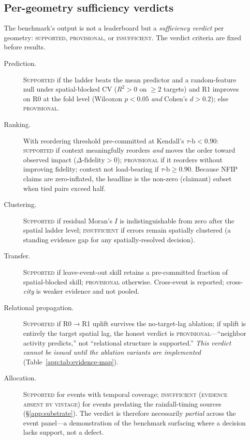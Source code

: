 \subsection{Per-geometry sufficiency verdicts}
\label{app:verdicts}
The benchmark's output is not a leaderboard but a \emph{sufficiency
verdict} per geometry: \textsc{supported}, \textsc{provisional}, or
\textsc{insufficient}. The verdict criteria are fixed before results.

\begin{description}
\item[Prediction.] \textsc{Supported} if the ladder beats the mean
  predictor and a random-feature null under spatial-blocked CV
  ($R^2>0$ on $\geq 2$ targets) and R1 improves on R0 at the fold level
  (Wilcoxon $p<0.05$ \emph{and} Cohen's $d>0.2$); else \textsc{provisional}.
\item[Ranking.] With reordering threshold pre-committed at Kendall's
  $\tau\text{-b}<0.90$: \textsc{supported} if context meaningfully reorders
  \emph{and} moves the order toward observed impact
  ($\Delta\text{-fidelity}>0$); \textsc{provisional} if it reorders without
  improving fidelity; context not load-bearing if $\tau\text{-b}\geq 0.90$.
  Because NFIP claims are zero-inflated, the headline is the non-zero
  (claimant) subset when tied pairs exceed half.
\item[Clustering.] \textsc{Supported} if residual Moran's $I$ is
  indistinguishable from zero after the spatial ladder level;
  \textsc{insufficient} if errors remain spatially clustered (a standing
  evidence gap for any spatially-resolved decision).
\item[Transfer.] \textsc{Supported} if leave-event-out skill retains a
  pre-committed fraction of spatial-blocked skill; \textsc{provisional}
  otherwise. Cross-event is reported; cross-\emph{city} is weaker evidence
  and not pooled.
\item[Relational propagation.] \textsc{Supported} if R0$\to$R1 uplift
  survives the no-target-lag ablation; if uplift is entirely the target
  spatial lag, the honest verdict is \textsc{provisional}---``neighbor
  activity predicts,'' not ``relational structure is supported.''
  \emph{This verdict cannot be issued until the ablation variants are
  implemented} (Table~\ref{app:tab:evidence-map}).
\item[Allocation.] \textsc{Supported} for events with temporal coverage;
  \textsc{insufficient (evidence absent by vintage)} for events predating
  the rainfall-timing sources (\S\ref{app:substrate}). The verdict is
  therefore necessarily \emph{partial} across the event panel---a
  demonstration of the benchmark surfacing where a decision lacks support,
  not a defect.
\end{description}

